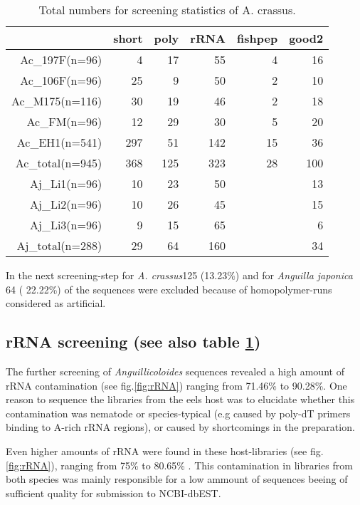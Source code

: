 \documentclass[12pt,a4paper]{article}
\begin{document}
\begin{table}[ht]
\begin{center}
\begin{tabular}{rrrrrr}
  \hline
 & short & poly & rRNA & fishpep & good2 \\ 
  \hline
Ac\_197F(n=96) &   4 &  17 &  55 &   4 &  16 \\ 
  Ac\_106F(n=96) &  25 &   9 &  50 &   2 &  10 \\ 
  Ac\_M175(n=116) &  30 &  19 &  46 &   2 &  18 \\ 
  Ac\_FM(n=96) &  12 &  29 &  30 &   5 &  20 \\ 
  Ac\_EH1(n=541) & 297 &  51 & 142 &  15 &  36 \\ 
  Ac\_total(n=945) & 368 & 125 & 323 &  28 & 100 \\ 
  Aj\_Li1(n=96) &  10 &  23 &  50 &  &  13 \\ 
  Aj\_Li2(n=96) &  10 &  26 &  45 &  &  15 \\ 
  Aj\_Li3(n=96) &   9 &  15 &  65 &  &   6 \\ 
  Aj\_total(n=288) &  29 &  64 & 160 &  &  34 \\ 
   \hline
\end{tabular}
\caption{Total numbers for screening statistics of A. crassus.}
\label{tab:num}
\end{center}
\end{table}
In the next screening-step for
\textit{A. crassus}125
(13.23\%) and for
\textit{Anguilla japonica} 64 (
22.22\%) of the sequences were
excluded because of homopolymer-runs considered as artificial.

\subsection*{rRNA screening (see also table \ref{tab:num})}

The further screening of \textit{Anguillicoloides} sequences revealed
a high amount of rRNA contamination (see fig.\ref{fig:rRNA}) ranging
from 71.46\% to
90.28\%. One reason to sequence
the libraries from the eels host was to elucidate whether this
contamination was nematode or species-typical (e.g caused by poly-dT
primers binding to A-rich rRNA regions), or caused by shortcomings in
the preparation.

Even higher amounts of rRNA were found in these host-libraries (see
fig. \ref{fig:rRNA}), ranging from
75\% to
80.65\% . This contamination in
libraries from both species was mainly responsible for a low ammount
of sequences beeing of sufficient quality for submission to
NCBI-dbEST.
\end{document}
